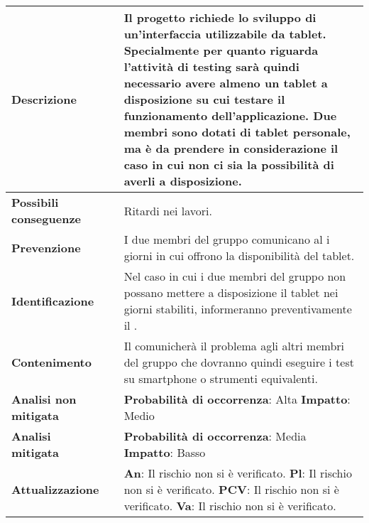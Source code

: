 \small
\begin{table}[H]
	\begin{center}			
		\begin{tabular}{p{2.5cm}p{0.5cm}p{11cm}}
			\arrayrulecolor{lightgray}
			
			\toprule				
			\textbf{Descrizione}
			& &
			Il progetto richiede lo sviluppo di un'interfaccia utilizzabile da tablet. Specialmente per quanto riguarda l'attività di testing sarà quindi necessario avere almeno un tablet a disposizione su cui testare il funzionamento dell'applicazione. Due membri sono dotati di tablet personale, ma è da prendere in considerazione il caso in cui non ci sia la possibilità di averli a disposizione.
			\\
			\midrule
			\textbf{Possibili \newline conseguenze}
			& &
			Ritardi nei lavori.
			\\
			\midrule
			\textbf{Prevenzione}
			& &
			I due membri del gruppo comunicano al \responsabilediprogetto{} i giorni in cui offrono la disponibilità del tablet.
			\\
			\midrule
			\textbf{Identificazione}
			& &
			Nel caso in cui i due membri del gruppo non possano mettere a disposizione il tablet nei giorni stabiliti, informeranno preventivamente il \responsabilediprogetto{}.
			\\
			\midrule
			\textbf{Contenimento}
			& &
			Il \responsabilediprogetto{} comunicherà il problema agli altri membri del gruppo che dovranno quindi eseguire i test su smartphone o strumenti equivalenti.
			\\
			\midrule
			\textbf{Analisi \newline non mitigata}
			& &
			\textbf{Probabilità di occorrenza}: Alta
			\newline
			\textbf{Impatto}: Medio
			\\
			\midrule
			\textbf{Analisi \newline mitigata}
			& &
			\textbf{Probabilità di occorrenza}: Media
			\newline
			\textbf{Impatto}: Basso
			\\
			\midrule
			\textbf{Attualizzazione}
			& &
			\textbf{An}: Il rischio non si è verificato.
			\newline
			\textbf{Pl}: Il rischio non si è verificato.
			\newline
			\textbf{PCV}: Il rischio non si è verificato.
			\newline
			\textbf{Va}: Il rischio non si è verificato.
			\\
			
			\bottomrule	
		\end{tabular}
	\end{center}
\end{table}			

